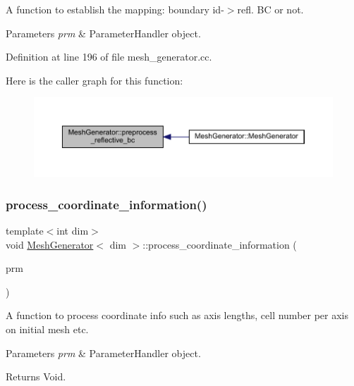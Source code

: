 A function to establish the mapping\+: boundary id-\/$>$refl. BC or not.


\begin{DoxyParams}{Parameters}
{\em prm} & Parameter\+Handler object. \\
\hline
\end{DoxyParams}


Definition at line 196 of file mesh\+\_\+generator.\+cc.

Here is the caller graph for this function\+:\nopagebreak
\begin{figure}[H]
\begin{center}
\leavevmode
\includegraphics[width=350pt]{class_mesh_generator_a93d10aa06b5b638a859e2fc53dbea5e0_icgraph}
\end{center}
\end{figure}
\mbox{\label{class_mesh_generator_a253330ef901e2a915576f6d6cd4262b5}} 
\subsubsection{\texorpdfstring{process\+\_\+coordinate\+\_\+information()}{process\_coordinate\_information()}}
{\footnotesize\ttfamily template$<$int dim$>$ \\
void \hyperlink{class_mesh_generator}{Mesh\+Generator}$<$ dim $>$\+::process\+\_\+coordinate\+\_\+information (\begin{DoxyParamCaption}\item[{Parameter\+Handler \&}]{prm }\end{DoxyParamCaption})\hspace{0.3cm}{\ttfamily [private]}}

A function to process coordinate info such as axis lengths, cell number per axis on initial mesh etc.


\begin{DoxyParams}{Parameters}
{\em prm} & Parameter\+Handler object. \\
\hline
\end{DoxyParams}
\begin{DoxyReturn}{Returns}
Void. 
\end{DoxyReturn}


